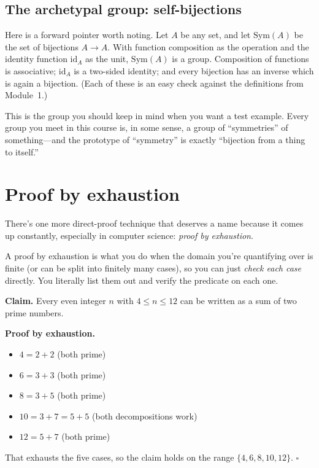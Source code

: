 \documentclass[11pt]{article}
\begin{document}
\subsection*{The archetypal group: self-bijections}

Here is a forward pointer worth noting. Let $A$ be any set, and let $\mathrm{Sym}(A)$ be the set of bijections $A \to A$. With function composition as the operation and the identity function $\mathrm{id}_A$ as the unit, $\mathrm{Sym}(A)$ is a group. Composition of functions is associative; $\mathrm{id}_A$ is a two-sided identity; and every bijection has an inverse which is again a bijection. (Each of these is an easy check against the definitions from Module~1.)

This is the group you should keep in mind when you want a test example. Every group you meet in this course is, in some sense, a group of ``symmetries'' of something---and the prototype of ``symmetry'' is exactly ``bijection from a thing to itself.''

\section{Proof by exhaustion}

There's one more direct-proof technique that deserves a name because it comes up constantly, especially in computer science: \emph{proof by exhaustion}.

A proof by exhaustion is what you do when the domain you're quantifying over is finite (or can be split into finitely many cases), so you can just \emph{check each case} directly. You literally list them out and verify the predicate on each one.

\textbf{Claim.} Every even integer $n$ with $4 \leq n \leq 12$ can be written as a sum of two prime numbers.

\textbf{Proof by exhaustion.}
\begin{itemize}
  \item $4 = 2 + 2$ (both prime)
  \item $6 = 3 + 3$ (both prime)
  \item $8 = 3 + 5$ (both prime)
  \item $10 = 3 + 7 = 5 + 5$ (both decompositions work)
  \item $12 = 5 + 7$ (both prime)
\end{itemize}
That exhausts the five cases, so the claim holds on the range $\{4, 6, 8, 10, 12\}$. \hfill$\square$
\end{document}
